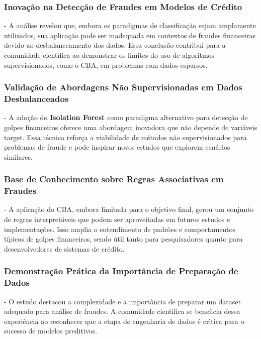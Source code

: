 \documentclass[12pt,a4paper]{article}
\begin{document}
\subsubsection{Inova\c{c}\~{a}o na Detec\c{c}\~{a}o de Fraudes em Modelos de Cr\'edito}
- A an\'alise revelou que, embora os paradigmas de classifica\c{c}\~{a}o sejam amplamente utilizados, sua aplica\c{c}\~{a}o pode ser inadequada em contextos de fraudes financeiras devido ao desbalanceamento dos dados. Essa conclus\~{a}o contribui para a comunidade cient\'{\i}fica ao demonstrar os limites do uso de algoritmos supervisionados, como o CBA, em problemas com dados esparsos.

\subsubsection{Valida\c{c}\~{a}o de Abordagens N\~{a}o Supervisionadas em Dados Desbalanceados}
- A ado\c{c}\~{a}o do \textbf{Isolation Forest} como paradigma alternativo para detec\c{c}\~{a}o de golpes financeiros oferece uma abordagem inovadora que n\~{a}o depende de vari\'{a}veis target. Essa t\'ecnica refor\c{c}a a viabilidade de m\'etodos n\~{a}o supervisionados para problemas de fraude e pode inspirar novos estudos que explorem cen\'arios similares.

\subsubsection{Base de Conhecimento sobre Regras Associativas em Fraudes}
- A aplica\c{c}\~{a}o do CBA, embora limitada para o objetivo final, gerou um conjunto de regras interpret\'aveis que podem ser aproveitadas em futuros estudos e implementa\c{c}\~{o}es. Isso amplia o entendimento de padr\~{o}es e comportamentos t\'ipicos de golpes financeiros, sendo \'{u}til tanto para pesquisadores quanto para desenvolvedores de sistemas de cr\'edito.

\subsubsection{Demonstra\c{c}\~{a}o Pr\'atica da Import\^ancia de Prepara\c{c}\~{a}o de Dados}
- O estudo destacou a complexidade e a import\^ancia de preparar um dataset adequado para an\'alise de fraudes. A comunidade cient\'{\i}fica se beneficia dessa experi\^{e}ncia ao reconhecer que a etapa de engenharia de dados \'{e} cr\'{\i}tica para o sucesso de modelos preditivos.
\end{document}
